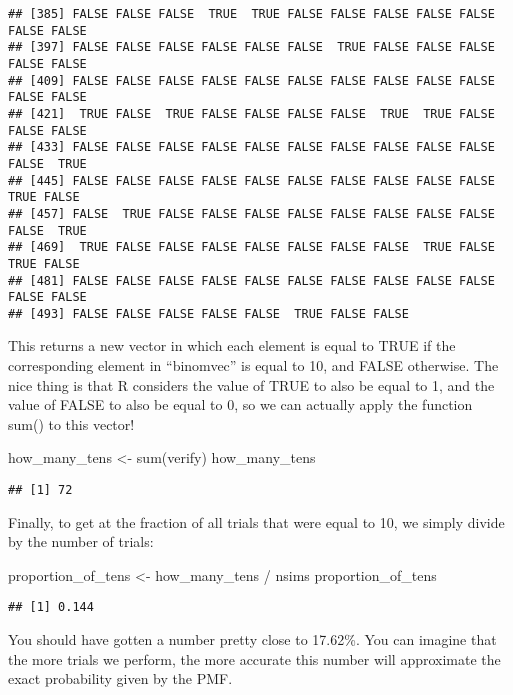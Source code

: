 \documentclass[
]{book}
\newenvironment{Shaded}{\begin{snugshade}}{\end{snugshade}}
\newcommand{\FunctionTok}[1]{\textcolor[rgb]{0.00,0.00,0.00}{#1}}
\newcommand{\NormalTok}[1]{#1}
\newcommand{\OtherTok}[1]{\textcolor[rgb]{0.56,0.35,0.01}{#1}}
\newcommand{\SpecialCharTok}[1]{\textcolor[rgb]{0.00,0.00,0.00}{#1}}
\begin{document}
\begin{verbatim}
## [385] FALSE FALSE FALSE  TRUE  TRUE FALSE FALSE FALSE FALSE FALSE FALSE FALSE
## [397] FALSE FALSE FALSE FALSE FALSE FALSE  TRUE FALSE FALSE FALSE FALSE FALSE
## [409] FALSE FALSE FALSE FALSE FALSE FALSE FALSE FALSE FALSE FALSE FALSE FALSE
## [421]  TRUE FALSE  TRUE FALSE FALSE FALSE FALSE  TRUE  TRUE FALSE FALSE FALSE
## [433] FALSE FALSE FALSE FALSE FALSE FALSE FALSE FALSE FALSE FALSE FALSE  TRUE
## [445] FALSE FALSE FALSE FALSE FALSE FALSE FALSE FALSE FALSE FALSE  TRUE FALSE
## [457] FALSE  TRUE FALSE FALSE FALSE FALSE FALSE FALSE FALSE FALSE FALSE  TRUE
## [469]  TRUE FALSE FALSE FALSE FALSE FALSE FALSE FALSE  TRUE FALSE  TRUE FALSE
## [481] FALSE FALSE FALSE FALSE FALSE FALSE FALSE FALSE FALSE FALSE FALSE FALSE
## [493] FALSE FALSE FALSE FALSE FALSE  TRUE FALSE FALSE
\end{verbatim}

This returns a new vector in which each element is equal to TRUE if the corresponding element in ``binomvec'' is equal to 10, and FALSE otherwise. The nice thing is that R considers the value of TRUE to also be equal to 1, and the value of FALSE to also be equal to 0, so we can actually apply the function sum() to this vector!

\begin{Shaded}
\begin{Highlighting}[]
\NormalTok{how\_many\_tens }\OtherTok{\textless{}{-}} \FunctionTok{sum}\NormalTok{(verify)}
\NormalTok{how\_many\_tens}
\end{Highlighting}
\end{Shaded}

\begin{verbatim}
## [1] 72
\end{verbatim}

Finally, to get at the fraction of all trials that were equal to 10, we simply divide by the number of trials:

\begin{Shaded}
\begin{Highlighting}[]
\NormalTok{proportion\_of\_tens }\OtherTok{\textless{}{-}}\NormalTok{ how\_many\_tens }\SpecialCharTok{/}\NormalTok{ nsims}
\NormalTok{proportion\_of\_tens}
\end{Highlighting}
\end{Shaded}

\begin{verbatim}
## [1] 0.144
\end{verbatim}

You should have gotten a number pretty close to 17.62\%. You can imagine that the more trials we perform, the more accurate this number will approximate the exact probability given by the PMF.
\end{document}
